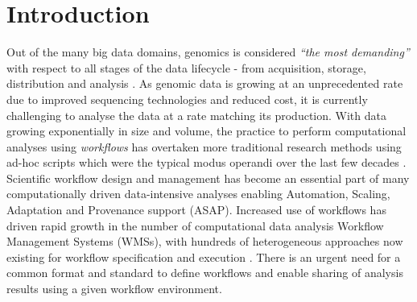 \documentclass[a4paper,num-refs]{oup-contemporary}
\begin{document}
\section{Introduction} \label{sec:introduction}
Out of the many big data domains, genomics is considered \textit{``the most demanding''} with respect to all stages of the data lifecycle - from acquisition, storage, distribution and analysis \citep{stephens_2015}. As genomic data is growing at an unprecedented rate due to improved sequencing technologies and reduced cost, it is currently challenging to analyse the data at a rate matching its production. With data growing exponentially in size and volume, the practice to perform computational analyses using \textit{workflows} has overtaken more traditional research methods using ad-hoc scripts which were the typical modus operandi over the last few decades \citep{atkinson_2017, Spjuth2015}. Scientific workflow design and management has become an essential part of many computationally driven data-intensive analyses enabling Automation, Scaling, Adaptation and Provenance support (ASAP)\citep{cuevasvicenttn_2012}. Increased use of workflows has driven rapid growth in the number of computational data analysis Workflow Management Systems (WMSs), with hundreds of heterogeneous approaches now existing for workflow specification and execution \citep{cwl-existing-workflow-systems}. There is an urgent need for a common format and standard to define workflows and enable sharing of analysis results using a given workflow environment. 
\end{document}
